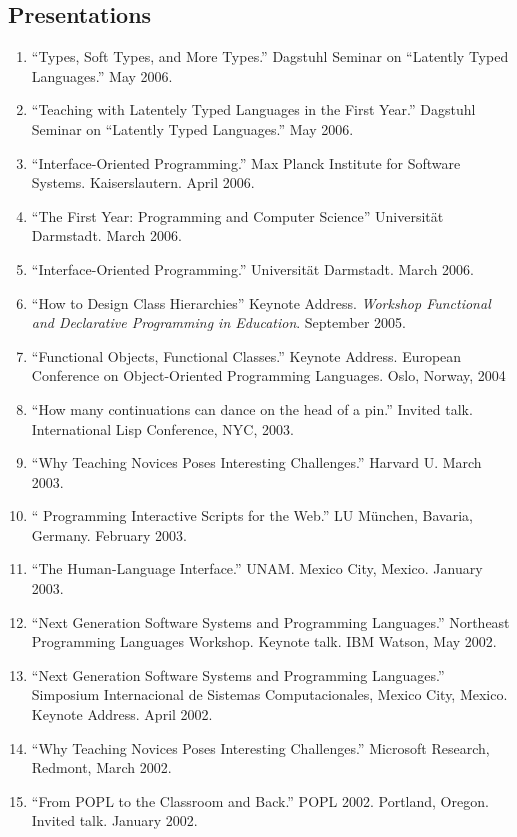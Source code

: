 
\subsection*{Presentations}

\begin{enumerate}
\item ``Types, Soft Types, and More Types.'' Dagstuhl Seminar on ``Latently
Typed Languages.'' May 2006. 

\item ``Teaching with Latentely Typed Languages in the First Year.''
Dagstuhl Seminar on ``Latently Typed Languages.'' May 2006. 

\item ``Interface-Oriented Programming.'' Max Planck Institute for Software
Systems. Kaiserslautern. April 2006. 

\item ``The First Year: Programming and Computer Science'' Universit{\"a}t
Darmstadt. March 2006. 

\item ``Interface-Oriented Programming.'' Universit{\"a}t Darmstadt. March
2006. 

\item ``How to Design Class Hierarchies'' Keynote Address. {\it Workshop
 Functional and Declarative Programming in Education\/}. September 2005.

\item ``Functional Objects, Functional Classes.'' Keynote Address. European
 Conference on Object-Oriented Programming Languages. Oslo, Norway, 2004

\item ``How many continuations can dance on the head of a pin.'' Invited
 talk. International Lisp Conference, NYC, 2003.

\item ``Why Teaching Novices Poses Interesting Challenges.'' Harvard U. 
March 2003. 

\item `` Programming Interactive Scripts for the Web.'' LU M\"unchen,
Bavaria, Germany. February 2003.  

\item ``The Human-Language Interface.''
UNAM. Mexico City, Mexico. January 2003. 

\item ``Next Generation Software Systems and Programming Languages.'' 
Northeast Programming Languages Workshop. Keynote talk. IBM Watson, May
2002.  
\item ``Next Generation Software Systems and Programming Languages.'' 
Simposium Internacional de Sistemas Computacionales, Mexico
City, Mexico. Keynote Address. April 2002.
\item ``Why Teaching Novices Poses Interesting Challenges.'' Microsoft
Research, Redmont, March 2002. 
\item ``From POPL to the Classroom and Back.'' POPL 2002. Portland,
Oregon. Invited talk. January 2002. 


\end{enumerate}
